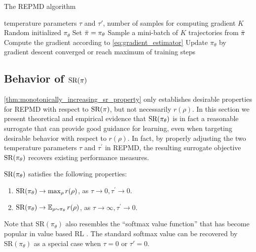 \begin{algorithm}[t]
	\caption{\label{alg:repmd}  The REPMD algorithm}
	\begin{algorithmic}[1]
		\INPUT temperature parameters $\tau$ and $\tau'$, number of samples for computing gradient $K$
		\STATE Random initialized $\pi_{\theta}$
		\STATE Set $\bar{\pi} = \pi_\theta$
		\REPEAT 
		\STATE Sample a mini-batch of $K$ trajectories from $\bar{\pi}$
		\STATE Compute the gradient according to \cref{eq:gradient_estimator}
		\STATE Update $\pi_{\theta}$ by gradient descent
		\UNTIL converged or reach maximum of training steps
		\ENDFOR
	\end{algorithmic}
\end{algorithm}


\subsection{Behavior of $\text{SR}(\pi)$}
\label{subsec:sr}

\cref{thm:monotonically_increasing_sr_property} only establishes
desirable properties for REPMD with respect to $\text{SR}(\pi)$,
but not necessarily $r(\rho)$.
In this section we present theoretical and empirical evidence that
$\text{SR}(\pi_\theta)$ is in fact a reasonable surrogate 
that can provide good guidance for learning,
even when targeting desirable behavior with respect to $r(\rho)$.
In fact, by properly adjusting the two temperature parameters $\tau$ and
$\tau^{\prime}$ in REPMD,
the resulting surrogate objective $\text{SR}(\pi_\theta)$
recovers existing performance measures. %

\begin{prop}
\label{prop:sr}
$\text{SR}(\pi_\theta)$ satisfies the following properties:
\begin{enumerate}[label=(\roman*)]
	\item  $\text{SR}(\pi_\theta) \to \max_{\rho}{r(\rho)}$, as $\tau \to 0, \tau^{\prime} \to 0$.
	\item $\text{SR}(\pi_\theta) \to \operatorname*{\mathbb{E}}_{\rho \sim \pi_\theta}{r(\rho)}$, as $\tau \to \infty, \tau^{\prime} \to 0$. 
\end{enumerate}	
\end{prop}

\begin{remk}
Note that $\text{SR}(\pi_\theta)$ also resembles the 
``softmax value function'' that 
has become popular in value based RL
\citep{nachum2017bridging,haarnoja2018soft,ding2017cold}.
The standard softmax value can be recovered by
$\text{SR}(\pi_\theta)$ as a special case when $\tau = 0$ or $\tau'=0$. 
\end{remk}


